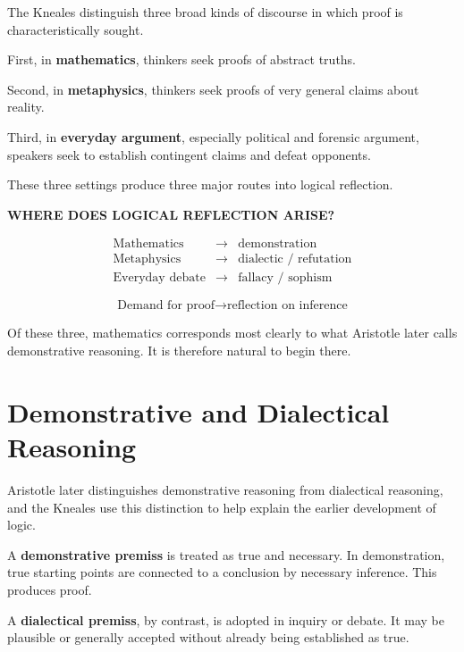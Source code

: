 \documentclass[11pt]{article}
\begin{document}
The Kneales distinguish three broad kinds of discourse in which
proof is characteristically sought.

First, in \textbf{mathematics}, thinkers seek proofs of abstract
truths.

Second, in \textbf{metaphysics}, thinkers seek proofs of very
general claims about reality.

Third, in \textbf{everyday argument}, especially political and
forensic argument, speakers seek to establish contingent claims
and defeat opponents.

These three settings produce three major routes into logical
reflection.

\begin{whiteboard}
\textbf{WHERE DOES LOGICAL REFLECTION ARISE?}

\[
\begin{array}{rcl}
\text{Mathematics}
&\longrightarrow&
\text{demonstration}
\\[0.4em]
\text{Metaphysics}
&\longrightarrow&
\text{dialectic / refutation}
\\[0.4em]
\text{Everyday debate}
&\longrightarrow&
\text{fallacy / sophism}
\end{array}
\]

\[
\boxed{
\text{Demand for proof}
\longrightarrow
\text{reflection on inference}
}
\]
\end{whiteboard}

Of these three, mathematics corresponds most clearly to what
Aristotle later calls demonstrative reasoning. It is therefore
natural to begin there.

\section{Demonstrative and Dialectical Reasoning}

Aristotle later distinguishes demonstrative reasoning from
dialectical reasoning, and the Kneales use this distinction to help
explain the earlier development of logic.

A \textbf{demonstrative premiss} is treated as true and necessary.
In demonstration, true starting points are connected to a
conclusion by necessary inference. This produces proof.

A \textbf{dialectical premiss}, by contrast, is adopted in inquiry
or debate. It may be plausible or generally accepted without
already being established as true.
\end{document}
